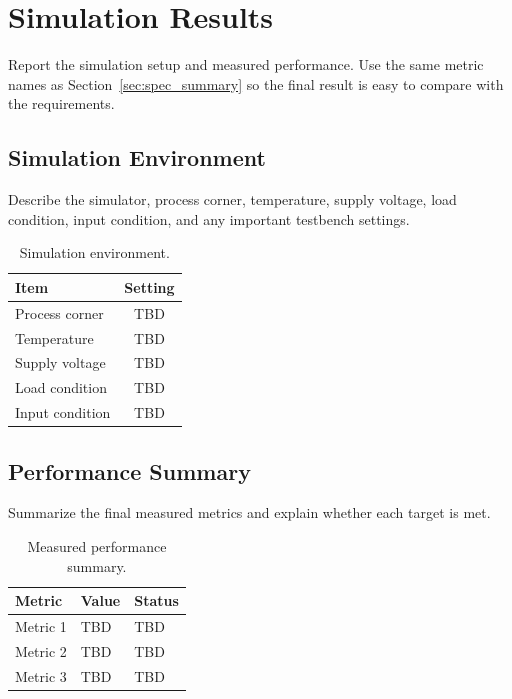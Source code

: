 \section{Simulation Results}
\label{sec:simulation_results}

Report the simulation setup and measured performance. Use the same metric names
as Section~\ref{sec:spec_summary} so the final result is easy to compare with the
requirements.

\subsection{Simulation Environment}

Describe the simulator, process corner, temperature, supply voltage, load
condition, input condition, and any important testbench settings.

\begin{table}[H]
    \centering
    \caption{Simulation environment.}
    \label{tab:simulation_environment}
    \renewcommand{\arraystretch}{1.2}
    \begin{tabular}{l c}
        \toprule
        \textbf{Item} & \textbf{Setting} \\
        \midrule
        Process corner & TBD \\
        Temperature & TBD \\
        Supply voltage & TBD \\
        Load condition & TBD \\
        Input condition & TBD \\
        \bottomrule
    \end{tabular}
\end{table}

\subsection{Performance Summary}

Summarize the final measured metrics and explain whether each target is met.

\begin{table}[H]
    \centering
    \caption{Measured performance summary.}
    \label{tab:measured_performance}
    \renewcommand{\arraystretch}{1.2}
    \begin{tabularx}{0.9\textwidth}{
        >{\raggedright\arraybackslash}X
        >{\centering\arraybackslash}p{3.5cm}
        >{\centering\arraybackslash}p{3cm}
    }
        \toprule
        \textbf{Metric} & \textbf{Value} & \textbf{Status} \\
        \midrule
        Metric 1 & TBD & TBD \\
        Metric 2 & TBD & TBD \\
        Metric 3 & TBD & TBD \\
        \bottomrule
    \end{tabularx}
\end{table}

